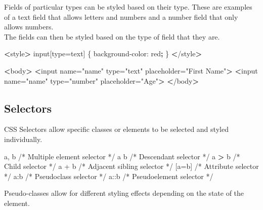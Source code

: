 \documentclass[]{book}
\newenvironment{Shaded}{\begin{snugshade}}{\end{snugshade}}
\newcommand{\ExtensionTok}[1]{#1}
\newcommand{\KeywordTok}[1]{\textcolor[rgb]{0.13,0.29,0.53}{\textbf{#1}}}
\newcommand{\NormalTok}[1]{#1}
\newcommand{\OperatorTok}[1]{\textcolor[rgb]{0.81,0.36,0.00}{\textbf{#1}}}
\newcommand{\StringTok}[1]{\textcolor[rgb]{0.31,0.60,0.02}{#1}}
\newcommand{\VariableTok}[1]{\textcolor[rgb]{0.00,0.00,0.00}{#1}}
\begin{document}
Fields of particular types can be styled based on their type. These are examples of a text field that allows letters and numbers and a number field that only allows numbers.\\
The fields can then be styled based on the type of field that they are.

\begin{Shaded}
\begin{Highlighting}[]
\OperatorTok{<}\ExtensionTok{style}\OperatorTok{>}
    \ExtensionTok{input}\NormalTok{[type=text] \{}
    \ExtensionTok{background-color}\NormalTok{: red}\KeywordTok{;}
\NormalTok{\}}
\OperatorTok{<}\NormalTok{/}\ExtensionTok{style}\OperatorTok{>}

\OperatorTok{<}\ExtensionTok{body}\OperatorTok{>}
    \OperatorTok{<}\ExtensionTok{input}\NormalTok{ name=}\StringTok{"name"}\NormalTok{ type=}\StringTok{"text"}\NormalTok{ placeholder=}\StringTok{"First Name"}\OperatorTok{>}
    \OperatorTok{<}\ExtensionTok{input}\NormalTok{ name=}\StringTok{"name"}\NormalTok{ type=}\StringTok{"number"}\NormalTok{ placeholder=}\StringTok{"Age"}\OperatorTok{>}
\OperatorTok{<}\NormalTok{/}\ExtensionTok{body}\OperatorTok{>}
\end{Highlighting}
\end{Shaded}

\hypertarget{selectors}{%
\subsection{Selectors}\label{selectors}}

CSS Selectors allow specific classes or elements to be selected and styled individually.

\begin{Shaded}
\begin{Highlighting}[]
\ExtensionTok{a}\NormalTok{, b /* Multiple element selector */}
\ExtensionTok{a}\NormalTok{ b /* Descendant selector */}
\ExtensionTok{a} \OperatorTok{>}\NormalTok{ b /* Child selector */}
\ExtensionTok{a}\NormalTok{ + b /* Adjacent sibling selector */}
\NormalTok{[}\VariableTok{a=}\NormalTok{b] }\ExtensionTok{/*}\NormalTok{ Attribute selector */}
\ExtensionTok{a}\NormalTok{:b /* Pseudoclass selector */}
\ExtensionTok{a}\NormalTok{::b /* Pseudoelement selector */}
\end{Highlighting}
\end{Shaded}

Pseudo-classes allow for different styling effects depending on the state of the element.
\end{document}
